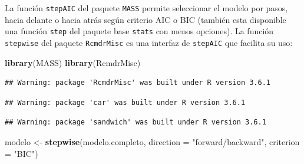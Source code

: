 \documentclass[]{book}
\newenvironment{Shaded}{\begin{snugshade}}{\end{snugshade}}
\newcommand{\DataTypeTok}[1]{\textcolor[rgb]{0.13,0.29,0.53}{#1}}
\newcommand{\KeywordTok}[1]{\textcolor[rgb]{0.13,0.29,0.53}{\textbf{#1}}}
\newcommand{\NormalTok}[1]{#1}
\newcommand{\StringTok}[1]{\textcolor[rgb]{0.31,0.60,0.02}{#1}}
\begin{document}
La función \texttt{stepAIC} del paquete \texttt{MASS} permite seleccionar el modelo por pasos,
hacia delante o hacia atrás según criterio AIC o BIC (también esta disponible una función \texttt{step} del paquete base \texttt{stats} con menos opciones).
La función \texttt{stepwise} del paquete \texttt{RcmdrMisc} es una interfaz de \texttt{stepAIC}
que facilita su uso:

\begin{Shaded}
\begin{Highlighting}[]
\KeywordTok{library}\NormalTok{(MASS)}
\KeywordTok{library}\NormalTok{(RcmdrMisc)}
\end{Highlighting}
\end{Shaded}

\begin{verbatim}
## Warning: package 'RcmdrMisc' was built under R version 3.6.1
\end{verbatim}

\begin{verbatim}
## Warning: package 'car' was built under R version 3.6.1
\end{verbatim}

\begin{verbatim}
## Warning: package 'sandwich' was built under R version 3.6.1
\end{verbatim}

\begin{Shaded}
\begin{Highlighting}[]
\NormalTok{modelo <-}\StringTok{ }\KeywordTok{stepwise}\NormalTok{(modelo.completo, }\DataTypeTok{direction =} \StringTok{"forward/backward"}\NormalTok{, }\DataTypeTok{criterion =} \StringTok{"BIC"}\NormalTok{)}
\end{Highlighting}
\end{Shaded}
\end{document}
